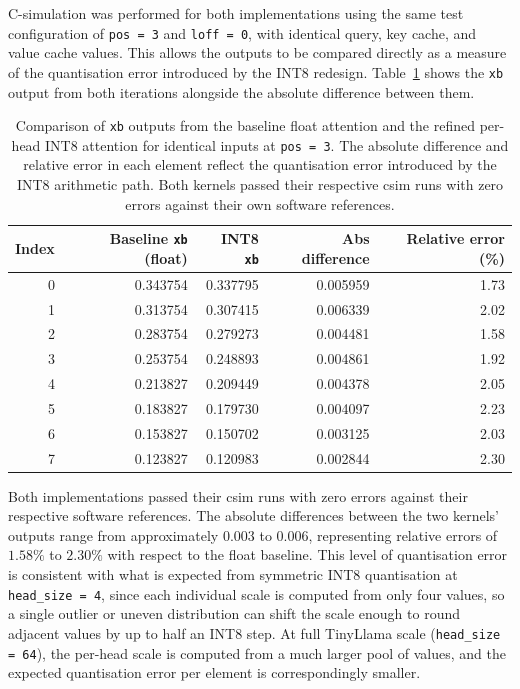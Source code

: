 C-simulation was performed for both implementations using the same
test configuration of \texttt{pos\,=\,3} and \texttt{loff\,=\,0}, with
identical query, key cache, and value cache values. This allows the
outputs to be compared directly as a measure of the quantisation error
introduced by the INT8 redesign. Table~\ref{tab:attn_csim_compare}
shows the \texttt{xb} output from both iterations alongside the
absolute difference between them.

\begin{table}[H]
  \centering
  \begin{tabular}{rrrrr}
    \toprule
    Index & Baseline \texttt{xb} (float) & INT8 \texttt{xb} & Abs difference & Relative error (\%) \\
    \midrule
    0 & 0.343754 & 0.337795 & 0.005959 & 1.73 \\
    1 & 0.313754 & 0.307415 & 0.006339 & 2.02 \\
    2 & 0.283754 & 0.279273 & 0.004481 & 1.58 \\
    3 & 0.253754 & 0.248893 & 0.004861 & 1.92 \\
    4 & 0.213827 & 0.209449 & 0.004378 & 2.05 \\
    5 & 0.183827 & 0.179730 & 0.004097 & 2.23 \\
    6 & 0.153827 & 0.150702 & 0.003125 & 2.03 \\
    7 & 0.123827 & 0.120983 & 0.002844 & 2.30 \\
    \bottomrule
  \end{tabular}
  \caption{Comparison of \texttt{xb} outputs from the baseline float
           attention and the refined per-head INT8 attention for identical
           inputs at \texttt{pos\,=\,3}. The absolute difference and
           relative error in each element reflect the quantisation error
           introduced by the INT8 arithmetic path. Both kernels passed
           their respective csim runs with zero errors against their own
           software references.}
  \label{tab:attn_csim_compare}
\end{table}

Both implementations passed their csim runs with zero errors against
their respective software references. The absolute differences between
the two kernels' outputs range from approximately $0.003$ to $0.006$,
representing relative errors of $1.58\%$ to $2.30\%$ with respect to
the float baseline. This level of quantisation error is consistent with
what is expected from symmetric INT8 quantisation at \texttt{head\_size\,=\,4},
since each individual scale is computed from only four values, so a single
outlier or uneven distribution can shift the scale enough to round
adjacent values by up to half an INT8 step. At full TinyLlama scale
(\texttt{head\_size\,=\,64}), the per-head scale is computed from a
much larger pool of values, and the expected quantisation error per
element is correspondingly smaller.


